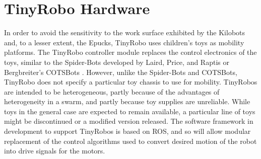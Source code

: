 \documentclass[letterpaper, 10 pt, conference]{ieeeconf}  %
\begin{document}
\section{TinyRobo Hardware}

In order to avoid the sensitivity to the work surface exhibited by the Kilobots and, to a lesser extent, the Epucks, TinyRobo uses children's toys as mobility platforms. 
The TinyRobo controller module replaces the control electronics of the toys, similar to the Spider-Bots developed by Laird, Price, and Raptis or Bergbreiter's COTSBots \cite{lairdspider, bergbreiter2003cotsbots}.
However, unlike the Spider-Bots and COTSBots, TinyRobo does not specify a particular toy chassis to use for mobility. 
TinyRobos are intended to be heterogeneous, partly because of the advantages of heterogeneity in a swarm, and partly because toy supplies are unreliable.
While toys in the general case are expected to remain available, a particular line of toys might be discontinued or a modified version released. 
The software framework in development to support TinyRobos is based on ROS, and so will allow modular replacement of the control algorithms used to convert desired motion of the robot into drive signals for the motors. 
\end{document}
